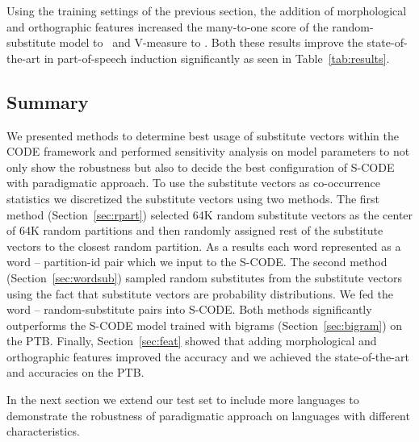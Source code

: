 Using the training settings of the previous section, the addition of
morphological and orthographic features increased the many-to-one
score of the random-substitute model to \ftmto\ and V-measure to
\ftvm.  Both these results improve the state-of-the-art in
part-of-speech induction significantly as seen in
Table~\ref{tab:results}.

\subsection{Summary}
\label{sec:expsum}

We presented methods to determine best usage of substitute vectors
within the CODE framework and performed sensitivity analysis on model
parameters to not only show the robustness but also to decide the best
configuration of S-CODE with paradigmatic approach.  To use the
substitute vectors as co-occurrence statistics we discretized the
substitute vectors using two methods.  The first method
(Section~\ref{sec:rpart}) selected 64K random substitute vectors as
the center of 64K random partitions and then randomly assigned rest of
the substitute vectors to the closest random partition.  As a results
each word represented as a word -- partition-id pair which we input to
the S-CODE. The second method (Section~\ref{sec:wordsub}) sampled
random substitutes from the substitute vectors using the fact that
substitute vectors are probability distributions.  We fed the word --
random-substitute pairs into S-CODE.  Both methods significantly
outperforms the S-CODE model trained with bigrams
(Section~\ref{sec:bigram}) on the PTB.  Finally,
Section~\ref{sec:feat} showed that adding morphological and
orthographic features improved the accuracy and we achieved the
state-of-the-art \mto and \vm accuracies on the PTB.

In the next section we extend our test set to include more languages
to demonstrate the robustness of paradigmatic approach on languages
with different characteristics.
